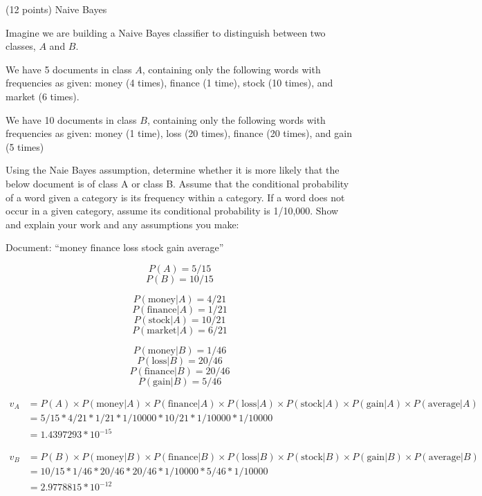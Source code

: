 \documentclass[paper=a4, fontsize=11pt]{scrartcl} %
\begin{document}
\begin{fancyquotes}
  (12 points) Naive Bayes

  Imagine we are building a Naive Bayes classifier to distinguish
  between two classes, $A$ and $B$.

  We have 5 documents in class $A$, containing only the following
  words with frequencies as given: money (4 times), finance (1 time),
  stock (10 times), and market (6 times).

  We have 10 documents in class $B$, containing only the following
  words with frequencies as given: money (1 time), loss (20 times),
  finance (20 times), and gain (5 times)

  Using the Naie Bayes assumption, determine whether it is more likely
  that the below document is of class A or class B. Assume that the
  conditional probability of a word given a category is its frequency
  within a category. If a word does not occur in a given category,
  assume its conditional probability is 1/10,000. Show and explain
  your work and any assumptions you make:

  Document: ``money finance loss stock gain average''
\end{fancyquotes}

$$P(A) = 5/15$$
$$P(B) = 10/15$$

$$P(\text{money}|A) = 4/21$$
$$P(\text{finance}|A) = 1/21$$
$$P(\text{stock}|A) = 10/21$$
$$P(\text{market}|A) = 6/21$$

$$P(\text{money}|B) = 1/46$$
$$P(\text{loss}|B) = 20/46$$
$$P(\text{finance}|B) = 20/46$$
$$P(\text{gain}|B) = 5/46$$

\begin{equation*}
  \begin{split}
    v_A &= P(A)\times P(\text{money}|A)\times P(\text{finance}|A)\times
    P(\text{loss}|A)\times P(\text{stock}|A)\times P(\text{gain}|A)\times
    P(\text{average}|A)\\
    &= 5/15*4/21*1/21*1/10000*10/21*1/10000*1/10000\\
    &= 1.4397293*10^{-15}
  \end{split}
\end{equation*}

\begin{equation*}
  \begin{split}
    v_B &= P(B)\times P(\text{money}|B)\times P(\text{finance}|B)\times
    P(\text{loss}|B)\times P(\text{stock}|B)\times P(\text{gain}|B)\times
    P(\text{average}|B)\\
    &= 10/15*1/46*20/46*20/46*1/10000*5/46*1/10000\\
    &= 2.9778815*10^{-12}
  \end{split}
\end{equation*}
\end{document}
